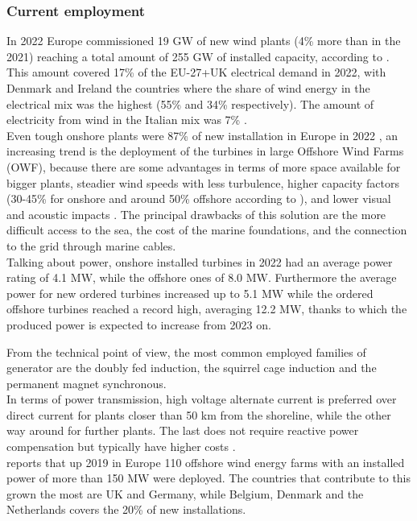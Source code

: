 \subsubsection{Current employment}
In 2022 Europe commissioned 19 $\si{\giga\watt}$ of new wind plants (4\% more than in the 2021) reaching a total amount of 255 $\si{\giga\watt}$ of installed capacity, according to \cite{wind_europe_data_2022}. This amount covered 17\% of the EU-27+UK electrical demand in 2022, with Denmark and Ireland the countries where the share of wind energy in the electrical mix was the highest (55\% and 34\% respectively). The amount of electricity from wind in the Italian mix was 7\% \cite{wind_europe_data_2022}.\\
Even tough onshore plants were 87\% of new installation in Europe in 2022 \cite{wind_europe_data_2022}, an increasing trend is the deployment of the turbines in large Offshore Wind Farms (OWF), because there are some advantages in terms of more space available for bigger plants, steadier wind speeds with less turbulence, higher capacity factors (30-45\% for onshore and around 50\% offshore according to \cite{wind_europe_data_2022}), and lower visual and acoustic impacts \cite{current_staus_and_future_trends_of_offshore_wind_power_in_europe}. The principal drawbacks of this solution are the more difficult access to the sea, the cost of the marine foundations, and the connection to the grid through marine cables.  \\
Talking about power, onshore installed turbines in 2022 had an average power rating of 4.1 $\si{\mega\watt}$, while the offshore ones of 8.0 $\si{\mega\watt}$. Furthermore the average power for new ordered turbines increased up to 5.1 $\si{\mega\watt}$ while the ordered offshore turbines reached a record high, averaging 12.2 $\si{\mega\watt}$, thanks to which the produced power is expected to increase from 2023 on.

From the technical point of view, the most common employed families of generator are the doubly fed induction, the squirrel cage induction and the permanent magnet synchronous.\\
In terms of power transmission, high voltage alternate current is preferred over direct current for plants closer than 50 km from the shoreline, while the other way around for further plants. The last does not require reactive power compensation but typically have higher costs \cite{current_staus_and_future_trends_of_offshore_wind_power_in_europe}.\\
\cite{current_staus_and_future_trends_of_offshore_wind_power_in_europe} reports that up 2019 in Europe 110 offshore wind energy farms with an installed power of more than 150 $\si{\mega\watt}$ were deployed. The countries that contribute to this grown the most are UK and Germany, while Belgium, Denmark and the Netherlands covers the 20\% of new installations.

